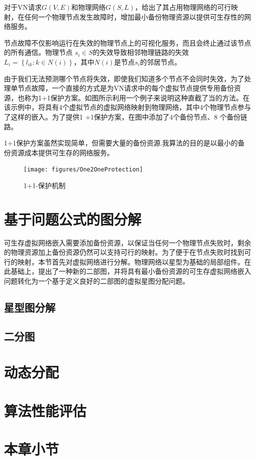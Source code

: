 对于VN请求$G (V,E)$和物理网络$G (S,L)$，给出了其占用物理网络的可行映射，在任何一个物理节点发生故障时，增加最小备份物理资源以提供可生存性的网络服务。

节点故障不仅影响运行在失效的物理节点上的可视化服务，而且会终止通过该节点的所有通信。物理节点 $ {s_i} \in S $的失效导致相邻物理链路的失效${L_i} = \left\{ {{l_{ik}}:k \in N(i)} \right\}$，其中${N(i)}$是节点$ {s_i} $的邻居节点。

由于我们无法预测哪个节点将失效，即使我们知道多个节点不会同时失效，为了处理单节点故障，一个直接的方式是为VN请求中的每个虚拟节点提供专用备份资源，也称为1+1保护方案。如图\cite{fig:One2OneProtection}所示利用一个例子来说明这种直截了当的方法。在该示例中，将具有4个虚拟节点的虚拟网络映射到物理网络，其中4个物理节点参与了这样的嵌入。为了提供1 +1保护方案，在图中添加了4个备份节点、8 个备份链路。

1+1保护方案虽然实现简单，但需要大量的备份资源.我算法的目的是以最小的备份资源成本提供可生存的网络服务。

\begin{figure}
\centering
\texttt{[image: figures/One2OneProtection]}\\
\caption{1+1-保护机制}\label{fig:One2OneProtection}
\end{figure}
\section{基于问题公式的图分解}
可生存虚拟网络嵌入需要添加备份资源，以保证当任何一个物理节点失败时，剩余的物理资源加上备份资源仍然可以支持可行的映射。为了便于在节点失败时找到可行的映射，本节首先对虚拟网络进行分解。物理网络以星型为基础的局部组件。在此基础上，提出了一种新的二部图，并将具有最小备份资源的可生存虚拟网络嵌入问题转化为一个基于定义良好的二部图的虚拟星图分配问题。
\subsection{星型图分解}

\subsection{二分图}

\section{动态分配}
\section{算法性能评估}
\section{本章小节}
